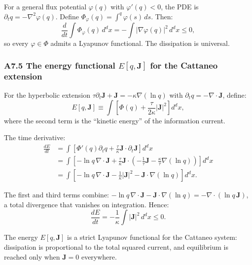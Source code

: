 \documentclass[reprint]{revtex4-2}
\begin{document}
For a general flux potential $\varphi(q)$ with $\varphi'(q)<0$, the PDE is $\partial_t q = -\nabla^2\varphi(q)$. Define $\Phi_\varphi(q) = \int^q \varphi(s)\,ds$. Then:
\begin{equation}
\frac{d}{dt}\int \Phi_\varphi(q)\,d^d x = -\int |\nabla\varphi(q)|^2\,d^d x \le 0,
\end{equation}
so every $\varphi\in\Phi$ admits a Lyapunov functional. The dissipation is universal.

\subsubsection{A7.5 The energy functional $E[q,\mathbf{J}]$ for the Cattaneo extension}

For the hyperbolic extension $\tau\partial_t\mathbf{J} + \mathbf{J} = -\kappa\nabla(\ln q)$ with $\partial_t q = -\nabla\cdot\mathbf{J}$, define:
\begin{equation}
E[q,\mathbf{J}] \equiv \int\left[\Phi(q) + \frac{\tau}{2\kappa}|\mathbf{J}|^2\right] d^d x,
\end{equation}
where the second term is the ``kinetic energy'' of the information current.

The time derivative:
\begin{align}
\frac{dE}{dt} &= \int\left[\Phi'(q)\partial_t q + \frac{\tau}{\kappa}\mathbf{J}\cdot\partial_t\mathbf{J}\right] d^d x\\
&= \int\left[-\ln q\,\nabla\cdot\mathbf{J} + \frac{\tau}{\kappa}\mathbf{J}\cdot\left(-\frac{1}{\tau}\mathbf{J} - \frac{\kappa}{\tau}\nabla(\ln q)\right)\right] d^d x\\
&= \int\left[-\ln q\,\nabla\cdot\mathbf{J} - \frac{1}{\kappa}|\mathbf{J}|^2 - \mathbf{J}\cdot\nabla(\ln q)\right] d^d x.
\end{align}

The first and third terms combine: $-\ln q\,\nabla\cdot\mathbf{J} - \mathbf{J}\cdot\nabla(\ln q) = -\nabla\cdot(\ln q\,\mathbf{J})$, a total divergence that vanishes on integration. Hence:
\begin{equation}
\boxed{\frac{dE}{dt} = -\frac{1}{\kappa}\int |\mathbf{J}|^2\,d^d x \le 0}.
\label{eq:energy_dissipation}
\end{equation}

The energy $E[q,\mathbf{J}]$ is a strict Lyapunov functional for the Cattaneo system: dissipation is proportional to the total squared current, and equilibrium is reached only when $\mathbf{J}=0$ everywhere.
\end{document}
